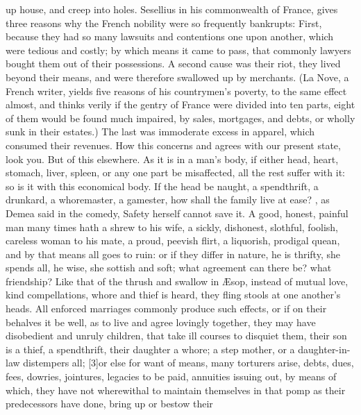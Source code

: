 up house, and creep into holes. Sesellius in his commonwealth of
France, gives three reasons why the French nobility were so
frequently bankrupts: First, because they had so many lawsuits and
contentions one upon another, which were tedious and costly; by which
means it came to pass, that commonly lawyers bought them out of their
possessions. A second cause was their riot, they lived beyond their
means, and were therefore swallowed up by merchants. (La Nove, a French
writer, yields five reasons of his countrymen's poverty, to the same
effect almost, and thinks verily if the gentry of France were divided
into ten parts, eight of them would be found much impaired, by sales,
mortgages, and debts, or wholly sunk in their estates.) The last was
immoderate excess in apparel, which consumed their revenues. How this
concerns and agrees with our present state, look you. But of this
elsewhere. As it is in a man's body, if either head, heart, stomach,
liver, spleen, or any one part be misaffected, all the rest suffer with
it: so is it with this economical body. If the head be naught, a
spendthrift, a drunkard, a whoremaster, a gamester, how shall the
family live at ease? , as Demea said in the comedy, Safety herself
cannot save it. A good, honest, painful man many times hath a shrew to
his wife, a sickly, dishonest, slothful, foolish, careless woman to his
mate, a proud, peevish flirt, a liquorish, prodigal quean, and by that
means all goes to ruin: or if they differ in nature, he is thrifty, she
spends all, he wise, she sottish and soft; what agreement can there be?
what friendship? Like that of the thrush and swallow in \AE{}sop, instead
of mutual love, kind compellations, whore and thief is heard, they
fling stools at one another's heads.  All enforced marriages commonly produce such effects, or if
on their behalves it be well, as to live and agree lovingly together,
they may have disobedient and unruly children, that take ill courses to
disquiet them, their son is a thief, a spendthrift, their daughter
a whore; a step mother, or a daughter-in-law distempers all;
[3\baselineskip]or else for want of means, many torturers arise, debts, dues,
fees, dowries, jointures, legacies to be paid, annuities issuing out,
by means of which, they have not wherewithal to maintain themselves in
that pomp as their predecessors have done, bring up or bestow their
